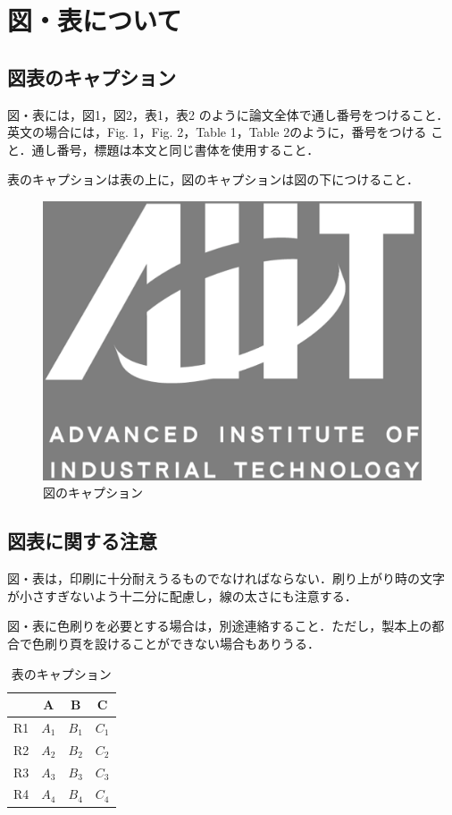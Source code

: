 \documentclass[a4j, 12Q, twocolumn, twoside]{jsarticle}
\begin{document}
\section{図・表について}
\subsection{図表のキャプション}
図・表には，図1，図2，表1，表2 のように論文全体で通し番号をつけること．
英文の場合には，Fig. 1，Fig. 2，Table 1，Table 2のように，番号をつける
こと．通し番号，標題は本文と同じ書体を使用すること．

表のキャプションは表の上に，図のキャプションは図の下につけること．

\begin{figure}
 \centering	%
 \includegraphics[height=8\baselineskip]{aiit_symbol.eps}
 \caption{図のキャプション}
 \label{fig:one}
\end{figure}

\subsection{図表に関する注意}
図・表は，印刷に十分耐えうるものでなければならない．刷り上がり時の文字
が小さすぎないよう十二分に配慮し，線の太さにも注意する．

図・表に色刷りを必要とする場合は，別途連絡すること．ただし，製本上の都
合で色刷り頁を設けることができない場合もありうる．

\begin{table}
 \centering
 \caption{表のキャプション}
 \begin{tabular}{c|ccc} \hline \hline
   & A & B & C \\ \hline
   R1 & $A_{1}$ & $B_{1}$ & $C_{1}$ \\
   R2 & $A_{2}$ & $B_{2}$ & $C_{2}$ \\
   R3 & $A_{3}$ & $B_{3}$ & $C_{3}$ \\
   R4 & $A_{4}$ & $B_{4}$ & $C_{4}$ \\ \hline
 \end{tabular}
 \vskip 5.5pt %
\end{table}
\end{document}
